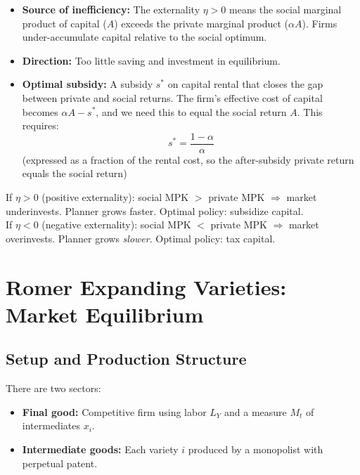 \documentclass[a4paper,11pt]{article}
\begin{document}
\begin{itemize}
    \item \textbf{Source of inefficiency:} The externality $\eta > 0$ means the social marginal product of capital ($A$) exceeds the private marginal product ($\alpha A$). Firms under-accumulate capital relative to the social optimum.
    \item \textbf{Direction:} Too little saving and investment in equilibrium.
    \item \textbf{Optimal subsidy:} A subsidy $s^*$ on capital rental that closes the gap between private and social returns. The firm's effective cost of capital becomes $\alpha A - s^*$, and we need this to equal the social return $A$. This requires:
    \[
    \boxed{s^* = \frac{1-\alpha}{\alpha}}
    \]
    (expressed as a fraction of the rental cost, so the after-subsidy private return equals the social return)
\end{itemize}

\begin{tcolorbox}[colback=orange!10,colframe=orange3,title=Intuition: Externality Direction]
If $\eta > 0$ (positive externality): social MPK $>$ private MPK $\Rightarrow$ market underinvests. Planner grows faster. Optimal policy: subsidize capital.\\[4pt]
If $\eta < 0$ (negative externality): social MPK $<$ private MPK $\Rightarrow$ market overinvests. Planner grows \textit{slower}. Optimal policy: tax capital.
\end{tcolorbox}

\clearpage

\section{Romer Expanding Varieties: Market Equilibrium}

\subsection*{Setup and Production Structure}

There are two sectors:
\begin{itemize}
    \item \textbf{Final good:} Competitive firm using labor $L_Y$ and a measure $M_t$ of intermediates $x_i$.
    \item \textbf{Intermediate goods:} Each variety $i$ produced by a monopolist with perpetual patent.
\end{itemize}
\end{document}
